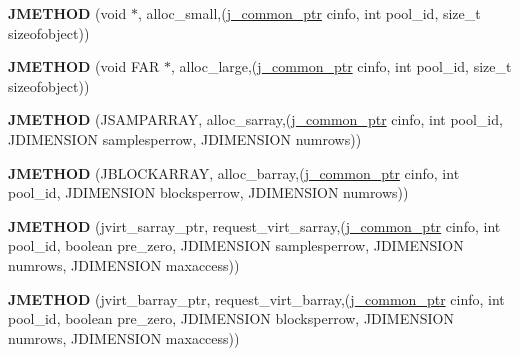 \begin{DoxyCompactItemize}
{\bfseries J\+M\+E\+T\+H\+OD} (void $\ast$, alloc\+\_\+small,(\hyperlink{structjpeg__common__struct}{j\+\_\+common\+\_\+ptr} cinfo, int pool\+\_\+id, size\+\_\+t sizeofobject))
\item 
\mbox{\label{structjpeg__memory__mgr_a130f6dbc700cc045bdbe35beff2cb326}} 
{\bfseries J\+M\+E\+T\+H\+OD} (void F\+AR $\ast$, alloc\+\_\+large,(\hyperlink{structjpeg__common__struct}{j\+\_\+common\+\_\+ptr} cinfo, int pool\+\_\+id, size\+\_\+t sizeofobject))
\item 
\mbox{\label{structjpeg__memory__mgr_a3fdd2e1dfdc089fd61f17b608c0263f2}} 
{\bfseries J\+M\+E\+T\+H\+OD} (J\+S\+A\+M\+P\+A\+R\+R\+AY, alloc\+\_\+sarray,(\hyperlink{structjpeg__common__struct}{j\+\_\+common\+\_\+ptr} cinfo, int pool\+\_\+id, J\+D\+I\+M\+E\+N\+S\+I\+ON samplesperrow, J\+D\+I\+M\+E\+N\+S\+I\+ON numrows))
\item 
\mbox{\label{structjpeg__memory__mgr_aefc8abe884dab5648c1e4e7ada2e2e18}} 
{\bfseries J\+M\+E\+T\+H\+OD} (J\+B\+L\+O\+C\+K\+A\+R\+R\+AY, alloc\+\_\+barray,(\hyperlink{structjpeg__common__struct}{j\+\_\+common\+\_\+ptr} cinfo, int pool\+\_\+id, J\+D\+I\+M\+E\+N\+S\+I\+ON blocksperrow, J\+D\+I\+M\+E\+N\+S\+I\+ON numrows))
\item 
\mbox{\label{structjpeg__memory__mgr_a34b830d9d7b2f4fd043e98421a700503}} 
{\bfseries J\+M\+E\+T\+H\+OD} (jvirt\+\_\+sarray\+\_\+ptr, request\+\_\+virt\+\_\+sarray,(\hyperlink{structjpeg__common__struct}{j\+\_\+common\+\_\+ptr} cinfo, int pool\+\_\+id, boolean pre\+\_\+zero, J\+D\+I\+M\+E\+N\+S\+I\+ON samplesperrow, J\+D\+I\+M\+E\+N\+S\+I\+ON numrows, J\+D\+I\+M\+E\+N\+S\+I\+ON maxaccess))
\item 
\mbox{\label{structjpeg__memory__mgr_aee93326ad6a64714443e90044614d2a6}} 
{\bfseries J\+M\+E\+T\+H\+OD} (jvirt\+\_\+barray\+\_\+ptr, request\+\_\+virt\+\_\+barray,(\hyperlink{structjpeg__common__struct}{j\+\_\+common\+\_\+ptr} cinfo, int pool\+\_\+id, boolean pre\+\_\+zero, J\+D\+I\+M\+E\+N\+S\+I\+ON blocksperrow, J\+D\+I\+M\+E\+N\+S\+I\+ON numrows, J\+D\+I\+M\+E\+N\+S\+I\+ON maxaccess))
\item 
\mbox{\label{structjpeg__memory__mgr_a35cc0c3b3ecbc7209cdc23b2255932d8}} 

\end{DoxyCompactItemize}
